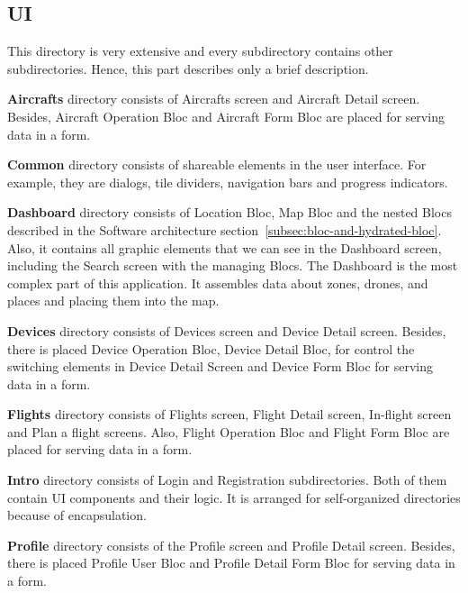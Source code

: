 \subsection{UI}\label{subsec:ui}
This directory is very extensive and every subdirectory contains other subdirectories.
Hence, this part describes only a brief description.


\textbf{Aircrafts} directory consists of Aircrafts screen and Aircraft Detail screen.
Besides, Aircraft Operation Bloc and Aircraft Form Bloc are placed for serving data in a form.


\textbf{Common} directory consists of shareable elements in the user interface.
For example, they are dialogs, tile dividers, navigation bars and progress indicators.


\textbf{Dashboard} directory consists of Location Bloc, Map Bloc and the nested Blocs described in the Software architecture section~\ref{subsec:bloc-and-hydrated-bloc}.
Also, it contains all graphic elements that we can see in the Dashboard screen, including the Search screen with the managing Blocs.
The Dashboard is the most complex part of this application.
It assembles data about zones, drones, and places and placing them into the map.


\textbf{Devices} directory consists of Devices screen and Device Detail screen.
Besides, there is placed Device Operation Bloc, Device Detail Bloc, for control the switching elements in Device Detail Screen and Device Form Bloc for serving data in a form.


\textbf{Flights} directory consists of Flights screen, Flight Detail screen, In-flight screen and Plan a flight screens.
Also, Flight Operation Bloc and Flight Form Bloc are placed for serving data in a form.


\textbf{Intro} directory consists of Login and Registration subdirectories.
Both of them contain UI components and their logic.
It is arranged for self-organized directories because of encapsulation.


\textbf{Profile} directory consists of the Profile screen and Profile Detail screen.
Besides, there is placed Profile User Bloc and Profile Detail Form Bloc for serving data in a form.

